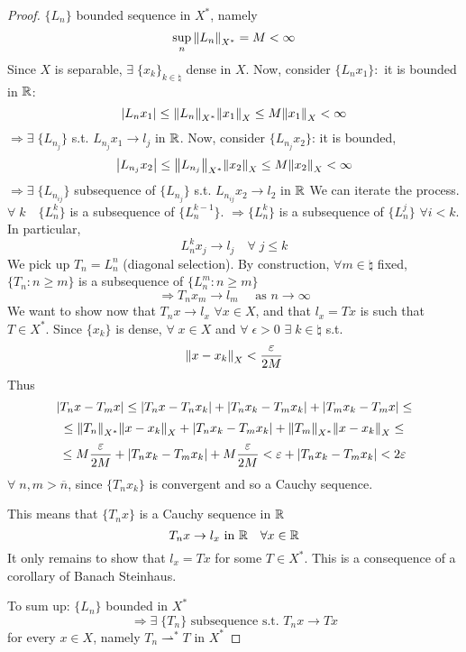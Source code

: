 \begin{proof}
    \(\{L_n\}\) bounded sequence in \(X^*\), namely
    \[
        \sup_{n} \norm{L_n}_{X^*} = M < \infty
    \]
    Since \(X\) is separable, \(\exists \; \{x_k\}_{k \in \natural}\) dense in \(X\). 
    Now, consider \(\{L_n x_1\}:\) it is bounded in \(\mathbb{R}\):
    \[
        \abs{L_n x_1} \leq \norm{L_n}_{X^*} \norm{x_1}_X \leq M \norm{x_1}_X < \infty
    \]
    \(\Rightarrow \exists \; \{L_{n_j}\}\) s.t. \(L_{n_j} x_1 \to l_j\) in \(\mathbb{R}\). Now, consider \(\{L_{n_j} x_2\}\): it is bounded,
    \[
        \abs{L_{n_j}x_2} \leq \norm{L_{n_j}}_{X^*} \norm{x_2}_X \leq M \norm{x_2}_X < \infty
    \]
    \(\Rightarrow \exists\; \{L_{n_{ij}}\}\) subsequence of \(\{L_{n_j}\}\) s.t. \( L_{n_{ij}} x_2 \to l_2\) in \(\mathbb{R}\)
    We can iterate the process. \(\forall \; k \quad \{L_n^k\}\) is a subsequence of \(\{L_n^{k-1}\}\). \(\Rightarrow \{L_n^k\}\) is a subsequence of \(\{L_n^j\}\) \(\forall i < k\). In particular, 
    \[
        L_n^k x_j \to l_j \quad \forall \; j \leq k
    \]
    We pick up \(T_n = L_n^n\) (diagonal selection). By construction, \(\forall m \in \natural\) fixed, \(\{T_n: n \geq m\}\) is a subsequence of \(\{L_n^m: n \geq m\}\) 
    \[
        \Rightarrow T_n x_m \to l_m \quad \text{ as } n \to \infty
    \]
    We want to show now that \(T_n x \to l_x\) \(\forall x \in X\), and that \(l_x = Tx\) is such that \(T \in X^*\). Since \(\{x_k\}\) is dense, \(\forall \; x \in X\) and \( \forall\; \epsilon >0\) \(\exists\; k \in \natural \) s.t. 
    \[
        \norm{x-x_k}_X < \frac{\varepsilon}{2M}
    \]
    Thus
    \[
        \abs{T_n x - T_m x} \leq \abs{T_n x - T_n x_k} + \abs{T_n x_k - T_m x_k} + \abs{T_m x_k - T_m x} \leq 
    \]
    \[
    \leq \norm{T_n}_{X^*} \norm{x -x_k}_X + \abs{T_n x_k - T_m x_k} + \norm{T_m}_{X^*} \norm{x -x_k}_X \leq
    \]
    \[
        \leq M \frac{\varepsilon}{2M} + \abs{T_n x_k - T_m x_k} + M \frac{\varepsilon}{2M} 
        < \varepsilon + \abs{T_n x_k - T_m x_k} < 2 \varepsilon
    \]
    \(\forall \; n, m > \overline{n}\), since \(\{T_n x_k\}\) is convergent and so a Cauchy sequence.

    This means that \(\{T_n x\}\) is a Cauchy sequence in \(\mathbb{R}\)
    \[
        T_n x \to l_x \text{ in } \mathbb{R} \quad \forall x \in \mathbb{R}
    \]
    It only remains to show that \(l_x = Tx\) for some \(T \in X^*\). This is a consequence of a corollary of Banach Steinhaus.

    To sum up: \(\{L_n\}\) bounded in \(X^*\)
    \[
        \Rightarrow \exists \; \{T_n\} \text{ subsequence s.t. } T_n x \to Tx
    \]
    for every \(x \in X\), namely \(T_n\rightharpoonup^* T\) in \(X^*\)
\end{proof}

